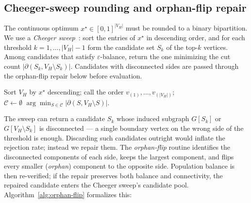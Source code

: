 \documentclass[11pt]{article}
\begin{document}
\subsection{Cheeger-sweep rounding and orphan-flip repair}\label{sec:rounding}

The continuous optimum $x^\star \in [0,1]^{|V_H|}$ must be rounded to a
binary bipartition. We use a \emph{Cheeger sweep}~\cite{kelner2009spectral}:
sort the entries of $x^\star$ in descending order, and for each
threshold $k = 1, \ldots, |V_H| - 1$ form the candidate set $S_k$ of the
top-$k$ vertices. Among candidates that satisfy $\varepsilon$-balance,
return the one minimizing the cut count
$|\partial(S_k, V_H \setminus S_k)|$. Candidates with disconnected sides
are passed through the orphan-flip repair below before evaluation.

\begin{algorithm}[H]
\caption{Cheeger-sweep rounding with orphan-flip repair}\label{alg:cheeger-sweep}
Sort $V_H$ by $x^\star$ descending; call the order $v_{(1)}, \ldots, v_{(|V_H|)}$;\\
$\mathcal{C} \gets \emptyset$ 
\Return $\arg\min_{S \in \mathcal{C}} |\partial(S, V_H \setminus S)|$.
\end{algorithm}

The sweep can return a candidate $S_k$ whose induced subgraph $G[S_k]$
or $G[V_H \setminus S_k]$ is disconnected --- a single boundary vertex
on the wrong side of the threshold is enough. Discarding such
candidates outright would inflate the rejection rate; instead we repair
them. The \emph{orphan-flip} routine identifies the disconnected
components of each side, keeps the largest component, and flips every
smaller (\emph{orphan}) component to the opposite side. Population
balance is then re-verified; if the repair preserves both balance and
connectivity, the repaired candidate enters the Cheeger sweep's
candidate pool. Algorithm~\ref{alg:orphan-flip} formalizes this:
\end{document}
